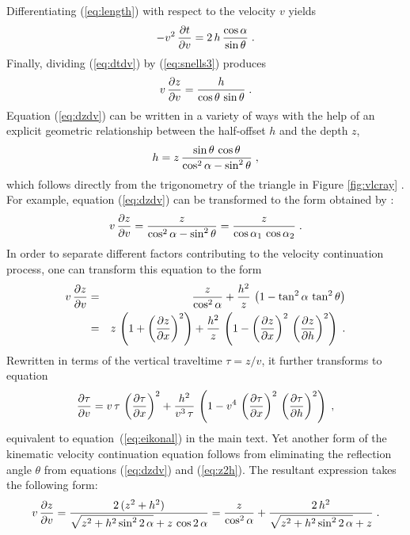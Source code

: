 Differentiating (\ref{eq:length}) with respect to the velocity $v$ yields
\begin{equation}
- v^2\,{{\partial t} \over {\partial v}} = 
2\,h\,{\cos{\alpha} \over \sin{\theta}}\;.
\label{eq:dtdv} 
\end{equation}
Finally, dividing (\ref{eq:dtdv}) by (\ref{eq:snells3}) produces
\begin{equation}
v\,{{\partial z} \over {\partial v}} = 
{h \over {\cos{\theta}\,\sin{\theta}}}\;.
\label{eq:dzdv} 
\end{equation}
Equation (\ref{eq:dzdv}) can be written in a variety of ways with the help
of an explicit geometric relationship between the half-offset $h$ and
the depth $z$, 
\begin{equation}
h = z\,
{{\sin{\theta}\,\cos{\theta}} \over
{\cos^2{\alpha}-\sin^2{\theta}}}\;, 
\label{eq:z2h} 
\end{equation}
which follows directly from the trigonometry of the triangle in Figure
\ref{fig:vlcray} \cite[]{ofcon}. For example, equation (\ref{eq:dzdv}) can
be transformed to the form obtained by \cite{GEO60-01-01420153}:
\begin{equation}
v\,{{\partial z} \over {\partial v}} = 
{z \over{\cos^2{\alpha}-\sin^2{\theta}}} =
{z \over{\cos{\alpha_1}\,\cos{\alpha_2}}}\;.
\label{eq:liu} 
\end{equation}
In order to separate different factors contributing to the velocity
continuation process, one can transform this equation to the form
\begin{eqnarray}
\nonumber
v\,{{\partial z} \over {\partial v}} & = & 
{z \over {\cos^2{\alpha}}} +
{{h^2} \over z}\,\left(1-\tan^2{\alpha}\,\tan^2{\theta}\right) \\
& = & z\,\left(1 + \left({{\partial z} \over {\partial x}}\right)^2\right) +
{{h^2} \over z}\,\left(1-\left({{\partial z} \over {\partial x}}\right)^2\,
\left({{\partial z} \over {\partial h}}\right)^2\right)\;.
\label{eq:zeikonal} 
\end{eqnarray}
Rewritten in terms of the vertical traveltime $\tau = z/v$, it further
transforms to equation 
\begin{equation}
{{\partial \tau} \over {\partial v}} = 
v\,\tau\,\left({{\partial \tau} \over {\partial x}}\right)^2 +
{{h^2} \over {v^3\,\tau}}\,\left(1 - 
v^4\,
\left({{\partial \tau} \over {\partial x}}\right)^2\,
\left({{\partial \tau} \over {\partial h}}\right)^2\right)\;,
\label{eq:eikonal0} 
\end{equation}
equivalent to equation~(\ref{eq:eikonal}) in the main text. Yet
another form of the kinematic velocity continuation equation follows
from eliminating the reflection angle $\theta$ from equations
(\ref{eq:dzdv}) and (\ref{eq:z2h}). The resultant expression takes the
following form:
\begin{equation}
v\,{{\partial z} \over {\partial v}} = 
{{2\,(z^2 + h^2)} \over
{\sqrt{z^2 + h^2 \sin^2{2\,\alpha}} + z\,\cos{2\,\alpha}}} =
{z \over {\cos^2{\alpha}}} + {{2\,h^2} \over
{\sqrt{z^2 + h^2 \sin^2{2\,\alpha}} + z}}\;.
\label{eq:notheta} 
\end{equation}

